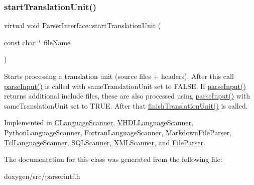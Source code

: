 \subsubsection{\texorpdfstring{startTranslationUnit()}{startTranslationUnit()}}
{\footnotesize\ttfamily virtual void Parser\+Interface\+::start\+Translation\+Unit (\begin{DoxyParamCaption}\item[{const char $\ast$}]{file\+Name }\end{DoxyParamCaption})\hspace{0.3cm}{\ttfamily [pure virtual]}}

Starts processing a translation unit (source files + headers). After this call \mbox{\hyperlink{class_parser_interface_a09ced377e619d40b7339187bad88341e}{parse\+Input()}} is called with same\+Translation\+Unit set to F\+A\+L\+SE. If \mbox{\hyperlink{class_parser_interface_a09ced377e619d40b7339187bad88341e}{parse\+Input()}} returns additional include files, these are also processed using \mbox{\hyperlink{class_parser_interface_a09ced377e619d40b7339187bad88341e}{parse\+Input()}} with same\+Translation\+Unit set to T\+R\+UE. After that \mbox{\hyperlink{class_parser_interface_af3acd64c6a33852e2e46e7288eb9c9cf}{finish\+Translation\+Unit()}} is called. 

Implemented in \mbox{\hyperlink{class_c_language_scanner_a8b667ac29ed52d3374f0df39a63d4c73}{C\+Language\+Scanner}}, \mbox{\hyperlink{class_v_h_d_l_language_scanner_a57e38f82bcb0ab8af7d6dabe131ad394}{V\+H\+D\+L\+Language\+Scanner}}, \mbox{\hyperlink{class_python_language_scanner_ae67929ac5a3d38fc925157f7a5f43497}{Python\+Language\+Scanner}}, \mbox{\hyperlink{class_fortran_language_scanner_a571f9440b581ce6fdc1b15c08427932d}{Fortran\+Language\+Scanner}}, \mbox{\hyperlink{class_markdown_file_parser_a82d0d8fad0f6772a9862eb3d9190127d}{Markdown\+File\+Parser}}, \mbox{\hyperlink{class_tcl_language_scanner_a60ddc698e1b483f71f4ce4ca4bffb512}{Tcl\+Language\+Scanner}}, \mbox{\hyperlink{class_s_q_l_scanner_acc0fa16e000516b6e36e563bb2fd9b18}{S\+Q\+L\+Scanner}}, \mbox{\hyperlink{class_x_m_l_scanner_a105515420268054f9ff54bd60793cfbb}{X\+M\+L\+Scanner}}, and \mbox{\hyperlink{class_file_parser_a4a8fa3af665adaca443c02ddd3d13d7d}{File\+Parser}}.



The documentation for this class was generated from the following file\+:\begin{DoxyCompactItemize}
\item 
doxygen/src/parserintf.\+h\end{DoxyCompactItemize}
